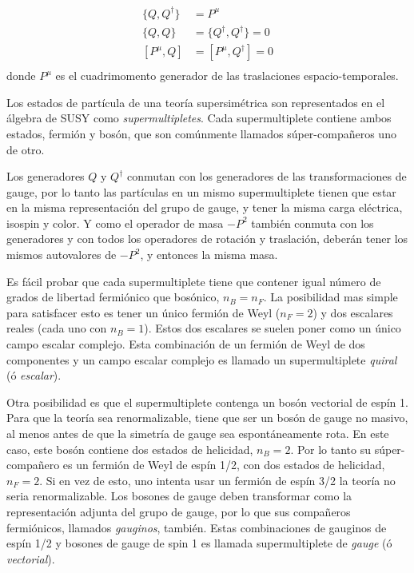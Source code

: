 \begin{align}
  \{Q, Q^\dagger\} &= P^\mu \\ \{Q, Q\} &= \{Q^\dagger, Q^\dagger\} = 0
  \\ [P^\mu, Q] &= [P^\mu, Q^\dagger] = 0 \\
\end{align}
%
donde $P^\mu$ es el cuadrimomento generador de las traslaciones
espacio-temporales.

Los estados de partícula de una teoría supersimétrica son representados en el
álgebra de SUSY como \emph{supermultipletes}. Cada supermultiplete contiene
ambos estados, fermión y bosón, que son comúnmente llamados súper-compa\~neros
uno de otro.

Los generadores $Q$ y $Q^\dagger$ conmutan con los generadores de las
transformaciones de gauge, por lo tanto las partículas en un mismo
supermultiplete tienen que estar en la misma representación del grupo de gauge,
y tener la misma carga eléctrica, isospin y color. Y como el operador de masa
$-P^2$ también conmuta con los generadores y con todos los operadores de
rotación y traslación, deberán tener los mismos autovalores de $-P^2$, y
entonces la misma masa.

Es fácil probar que cada supermultiplete tiene que contener igual número de
grados de libertad fermiónico que bosónico, $n_B = n_F$. La posibilidad mas
simple para satisfacer esto es tener un único fermión de Weyl ($n_F=2$) y dos
escalares reales (cada uno con $n_B=1$). Estos dos escalares se suelen poner
como un único campo escalar complejo. Esta combinación de un fermión de Weyl de
dos componentes y un campo escalar complejo es llamado un supermultiplete
\emph{quiral} (ó \emph{escalar}).

Otra posibilidad es que el supermultiplete contenga un bosón vectorial de espín
1. Para que la teoría sea renormalizable, tiene que ser un bosón de gauge no
masivo, al menos antes de que la simetría de gauge sea espontáneamente rota. En
este caso, este bosón contiene dos estados de helicidad, $n_B=2$. Por lo tanto
su súper-compa\~nero es un fermión de Weyl de espín 1/2, con dos estados de
helicidad, $n_F=2$. Si en vez de esto, uno intenta usar un fermión de espín 3/2
la teoría no seria renormalizable. Los bosones de gauge deben transformar como
la representación adjunta del grupo de gauge, por lo que sus compañeros
fermiónicos, llamados \emph{gauginos}, también. Estas combinaciones de gauginos
de espín 1/2 y bosones de gauge de spin 1 es llamada supermultiplete de
\emph{gauge} (ó \emph{vectorial}).

